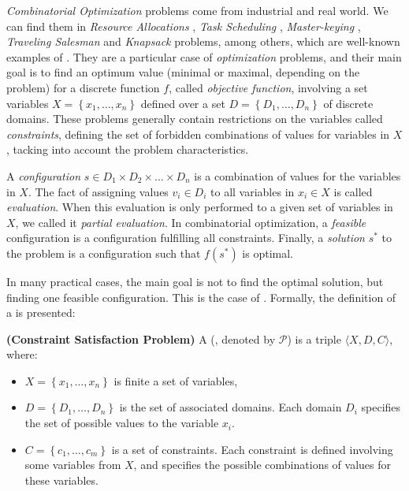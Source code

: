 \textit{Combinatorial Optimization} problems come from industrial and real world. We can find them in {\it Resource Allocations} \cite{Akplogan2011}, \textit{Task Scheduling} \cite{Sibbesen2008}, \textit{Master-keying} \cite{Espelage2000}, \textit{Traveling Salesman} and \textit{Knapsack} problems, among others, which are well-known examples of \cops{} \cite{Smith2005}. They are a particular case of \textit{optimization} problems, and their main goal is to find an optimum value (minimal or maximal, depending on the problem) for a discrete function $f$, called \textit{objective function}, involving a set variables $X = \left\{x_1, \dots, x_n\right\}$ defined over a set $D = \left\{D_1, \dots, D_n\right\}$ of discrete domains. These problems generally contain restrictions on the variables called \textit{constraints}, defining the set of forbidden combinations of values for variables in $X$, tacking into account the problem characteristics.

A \textit{configuration} $s\in D_1\times D_2\times\dots\times D_n$ is a combination of values for the variables in $X$. The fact of assigning values $v_i \in D_i$ to all variables in $x_i \in X$ is called \textit{evaluation}. When this evaluation is only performed to a given set of variables in $X$, we called it \textit{partial evaluation}. In combinatorial optimization, a \textit{feasible} configuration is a configuration fulfilling all constraints. Finally, a \textit{solution} $s^*$ to the problem is a configuration such that $f(s^*)$ is optimal.

In many practical cases, the main goal is not to find the optimal solution, but finding one feasible configuration. This is the case of \CSPs. Formally, the definition of a \csp{} is presented: 

\begin{definition}{\bf (Constraint Satisfaction Problem)}
\label{def:csp}
A \CSP{} (\csp, denoted by $\mathcal{P}$) is a triple $\langle X,D,C \rangle$, where:
\begin{itemize}
\item $X = \left\{x_1,\ldots,x_n\right\}$ is finite a set of variables,
\item $D = \left\{D_1,\ldots, D_n\right\}$ is the set of associated domains. Each domain $D_i$ specifies the set of possible values to the variable $x_i$. %
\item $C = \left\{c_1,\ldots, c_m\right\}$ is a set of constraints. Each constraint is defined involving some variables from $X$, and specifies the possible combinations of values for these variables.
\end{itemize}
\end{definition}

